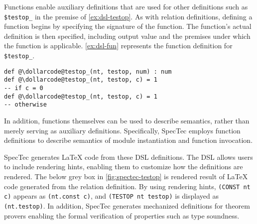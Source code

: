 Functions enable auxiliary definitions that are used for other definitions such
as \texttt{\$testop\_} in the premise of \cref{ex:dsl-testop}.
As with relation definitions, defining a function begins by specifying the
signature of the function.
The function's actual definition is then specified, including output value and
the premises under which the function is applicable.
\cref{ex:dsl-fun} represents the function definition for \texttt{\$testop\_}.
\newpage
\begin{example}
\begin{lstlisting}[style=dsl]
def @\dollarcode@testop_(nt, testop, num) : num
def @\dollarcode@testop_(nt, testop, c) = 1
-- if c = 0
def @\dollarcode@testop_(nt, testop, c) = 1
-- otherwise
\end{lstlisting}
  \label{ex:dsl-fun}
\end{example}
In addition, functions themselves can be used to describe semantics, rather
than merely serving as auxiliary definitions.
Specifically, SpecTec employs function definitions to describe semantics of module
instantiation and function invocation.


SpecTec generates LaTeX code from these DSL definitions.
The DSL allows users to include rendering hints, enabling them to customize how
the definitions are rendered.
The below grey box in \cref{fig:spectec-testop} is rendered result of
LaTeX code generated from the relation definition.
By using rendering hints, \texttt{(CONST nt c)} appears as \texttt{(nt.const
c)}, and \texttt{(TESTOP nt testop)} is displayed as \texttt{(nt.testop)}.
In addition, SpecTec generates mechanized definitions for theorem provers
enabling the formal verification of properties such as type soundness.

